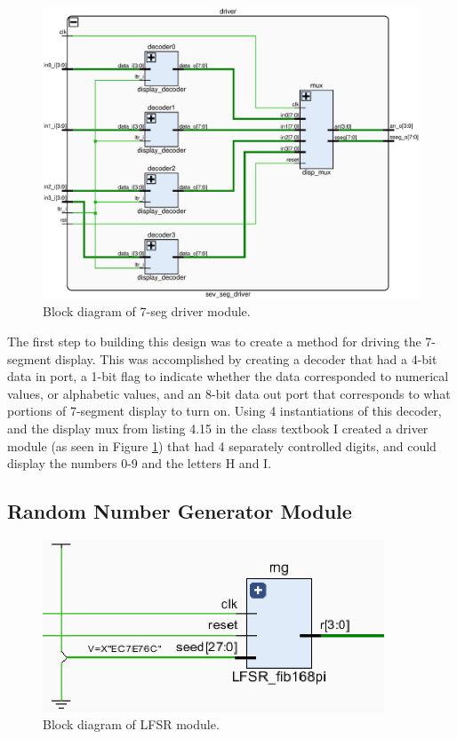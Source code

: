 \documentclass[11pt]{article}
\begin{document}
\begin{figure}[H]
	\includegraphics [width=5in]{./figures/display_driver.eps}
	\centering
	\caption{Block diagram of 7-seg driver module.}
	\label{fig:7SegDriver}
\end{figure}

The first step to building this design was to create a method for driving the 7-segment display. This was accomplished by creating a decoder that had a 4-bit data in port, a 1-bit flag to indicate whether the data corresponded to numerical values, or alphabetic values, and an 8-bit data out port that corresponds to what portions of 7-segment display to turn on. Using 4 instantiations of this decoder, and the display mux from listing 4.15 in the class textbook I created a driver module (as seen in Figure \ref{fig:7SegDriver}) that had 4 separately controlled digits, and could display the numbers 0-9 and the letters H and I.

\subsection{Random Number Generator Module}

\begin{figure}[H]
\includegraphics [width=4in]{./figures/lfsr.eps}
	\centering
	\caption{Block diagram of LFSR module.}
	\label{fig:LFSRmod}
\end{figure}
\end{document}
